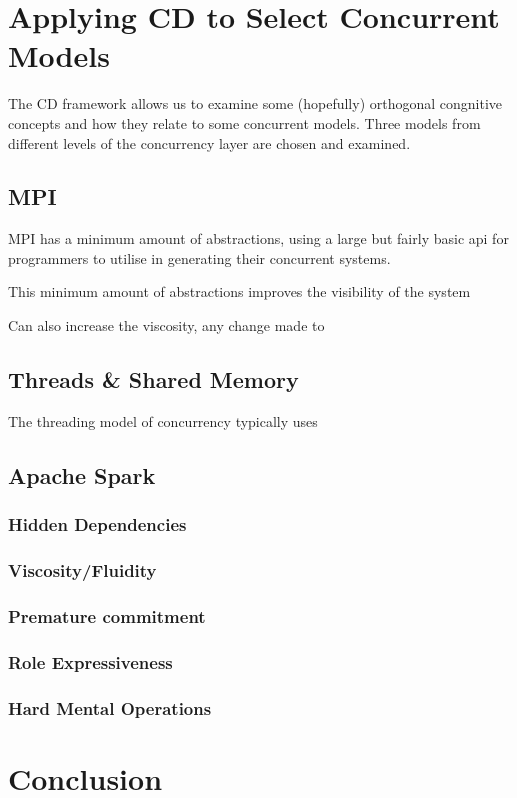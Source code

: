 \documentclass{sig-alternate}
\begin{document}
\section{Applying CD to Select Concurrent Models}
The CD framework allows us to examine some (hopefully) orthogonal congnitive concepts and how they relate to some concurrent models. Three models from different levels of the concurrency layer are chosen and examined.

\subsection{MPI}
MPI has a minimum amount of abstractions, using a large but fairly basic api for programmers to utilise in generating their concurrent systems.

This minimum amount of abstractions improves the visibility of the system

Can also increase the viscosity, any change made to 

\subsection{Threads & Shared Memory}
The threading model of concurrency typically uses 


\subsection{Apache Spark}
\subsubsection{Hidden Dependencies}

\subsubsection{Viscosity/Fluidity}

\subsubsection{Premature commitment}

\subsubsection{Role Expressiveness}

\subsubsection{Hard Mental Operations}

\section{Conclusion}





\end{document}
